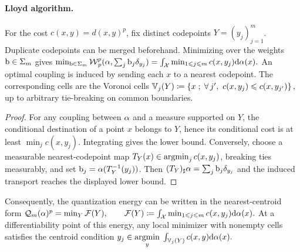 \paragraph{Lloyd algorithm.}
\begin{prop}\label{prop-free-masses-voronoi}
For the cost $c(x,y)=d(x,y)^p$, fix distinct codepoints $Y=(y_j)_{j=1}^m$. Duplicate codepoints can be merged beforehand. Minimizing over the weights $\mathrm{b}\in\Sigma_m$ gives
\(\min_{\mathrm{b}\in\Sigma_m} \operatorname{\mathcal{W}}_p^p(\alpha,\sum_j \mathrm{b}_j\delta_{y_j}) = \int_{\mathcal{X}} \min_{1\leqslant j\leqslant m} c(x,y_j)\mathrm{d}\alpha(x).\)
An optimal coupling is induced by sending each $x$ to a nearest codepoint. The corresponding cells are the Voronoi cells
\(\VV_j(Y) \eqdef \enscond{x}{\foralls j',\ c(x,y_j)\leq c(x,y_{j'})},\)
up to arbitrary tie-breaking on common boundaries.
\end{prop}
\begin{proof}
For any coupling between $\alpha$ and a measure supported on $Y$, the conditional destination of a point $x$ belongs to $Y$, hence its conditional cost is at least $\min_j c(x,y_j)$. Integrating gives the lower bound. Conversely, choose a measurable nearest-codepoint map $T_Y(x)\in\operatorname{argmin}_j c(x,y_j)$, breaking ties measurably, and set $\mathrm{b}_j=\alpha(T_Y^{-1}(y_j))$. Then $(T_Y)_\sharp\alpha=\sum_j \mathrm{b}_j\delta_{y_j}$ and the induced transport reaches the displayed lower bound.
\end{proof}
Consequently, the quantization energy can be written in the nearest-centroid form
\(\mathcal{Q}_m(\alpha)^p = \min_Y \mathcal{F}(Y), \qquad \mathcal{F}(Y) \coloneqq \int_{\mathcal{X}} \min_{1\leqslant j\leqslant m} c(x,y_j)\mathrm{d}\alpha(x).\)
At a differentiability point of this energy, any local minimizer with nonempty cells satisfies the centroid condition
\(y_j \in \underset{y}{\operatorname{argmin}}\; \int_{\mathbb{V}_j(Y)} c(x,y)\mathrm{d}\alpha(x).\)
